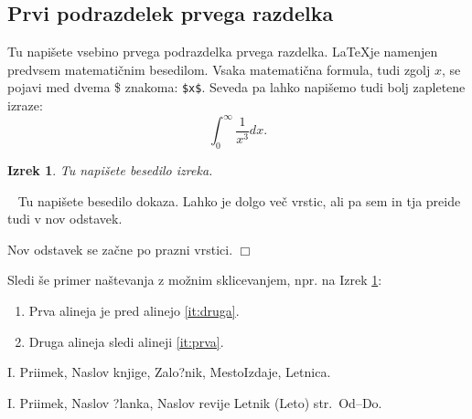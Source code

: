\documentclass{article}[12pt]
\newtheorem{izrek}{Izrek}
\newenvironment{dokaz}%
{\noindent{\bf Dokaz.}\ }%
{\hfill$\Box$\par\bigskip}%
\begin{document}
\subsection{Prvi podrazdelek prvega razdelka}

Tu napišete vsebino prvega podrazdelka prvega razdelka. \LaTeX je namenjen predvsem matematičnim besedilom. Vsaka matematična formula, tudi zgolj $x$, se pojavi med dvema \$ znakoma: \verb.$x$.. Seveda pa lahko napišemo tudi bolj zapletene izraze: $$\int_0^\infty \frac{1}{x^3}dx.$$


\begin{izrek}
\label{iz:prviIzrek}
Tu napišete besedilo izreka.
\end{izrek}
\begin{dokaz}
Tu napišete besedilo dokaza. Lahko je dolgo več vrstic, ali pa sem in tja preide tudi v nov odstavek.

Nov odstavek se začne po prazni vrstici.
\end{dokaz}


Sledi še primer naštevanja z možnim sklicevanjem, npr. na Izrek \ref{iz:prviIzrek}: 
\begin{enumerate}[label=(\roman{*}), ref=(\roman{*})]
\item \label{it:prva} Prva alineja je pred alinejo \ref{it:druga}.
\item \label{it:druga} Druga alineja sledi alineji \ref{it:prva}.
\end{enumerate}

\begin{thebibliography}{99}



 I. Priimek, Naslov knjige, Zalo?nik, MestoIzdaje, Letnica.

 I. Priimek, Naslov ?lanka, Naslov revije Letnik (Leto) str.\ Od--Do.
\end{thebibliography}
\end{document}
